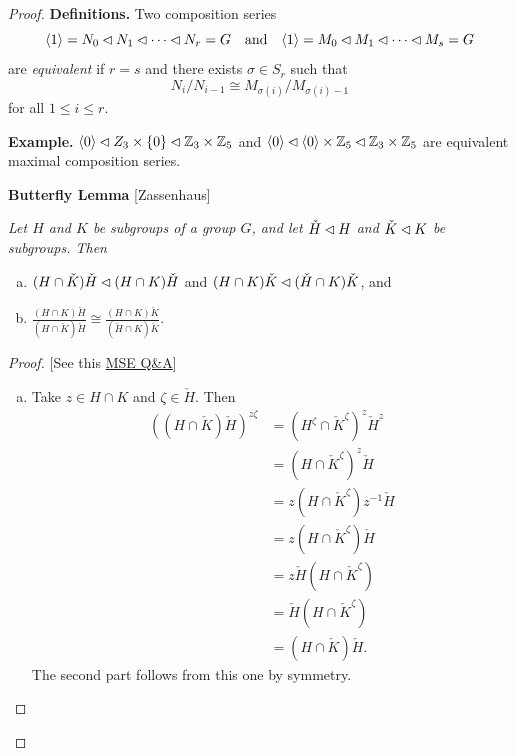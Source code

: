 \begin{proof}
\textbf{Definitions.} Two composition series
\begin{equation}\label{eq9}
    \langle1\rangle=N_0\lhd N_1\lhd\cdots\lhd N_r=G\quad\text{and}\quad
    \langle1\rangle=M_0\lhd M_1\lhd\cdots\lhd M_s=G
\end{equation}
are \textsl{equivalent} if $r=s$ and there exists $\sigma\in S_r$ such that
$$
    N_i/N_{i-1}\cong M_{\sigma(i)}/M_{\sigma(i)-1}
$$
for all $1\le i\le r$.

\textbf{Example.} $\langle0\rangle\lhd Z_3\times\{0\}\lhd\mathbb{Z}_3\times\mathbb{Z}_5$ and $\langle0\rangle\lhd\langle0\rangle\times\mathbb{Z}_5\lhd\mathbb{Z}_3\times\mathbb{Z}_5$ are equivalent maximal composition series.

\medskip

\textbf{Butterfly Lemma} [Zassenhaus] {\itshape Let\/ $H$ and\/ $K$ be subgroups of a group\/ $G$, and let\/ $\check H\lhd H$ and\/ $\check K\lhd K$ be subgroups. Then
\begin{enumerate}[a),font=\upshape]
    \item $(H\cap\check K)\check H\lhd (H\cap K)\check H$ and\/
    $(H\cap K)\check K\lhd(\check H\cap K)\check K$, and
    \item
    $\displaystyle
    \frac{(H\cap K){\check H}}{(H\cap {\check K}){\check H}} \cong \frac{(H\cap K){\check K}}{(\check H\cap K){\check K}}.
    $
\end{enumerate}
}
\begin{proof} {[See this \href{https://math.stackexchange.com/q/3857104/269050}{MSE Q\&A}]}
\begin{enumerate}[a),font=\upshape]
    \item Take $z\in H\cap K$ and $\zeta\in\check H$. Then
    \begin{align*}
        ((H\cap\check K)\check H)^{z\zeta}
            &= (H^\zeta\cap{\check K}^\zeta)^z{\check H}^z\\
            &= (H\cap{\check K}^\zeta)^z\check H\\
            &= z(H\cap{\check K}^\zeta)z^{-1}\check H\\
            &= z(H\cap{\check K}^\zeta)\check H\\
            &= z\check H(H\cap{\check K}^\zeta)\\
            &= \check H(H\cap{\check K}^\zeta)\\
            &= (H\cap\check K)\check H.
    \end{align*}
    The second part follows from this one by symmetry.
    

\end{enumerate}
\end{proof}
\end{proof}
